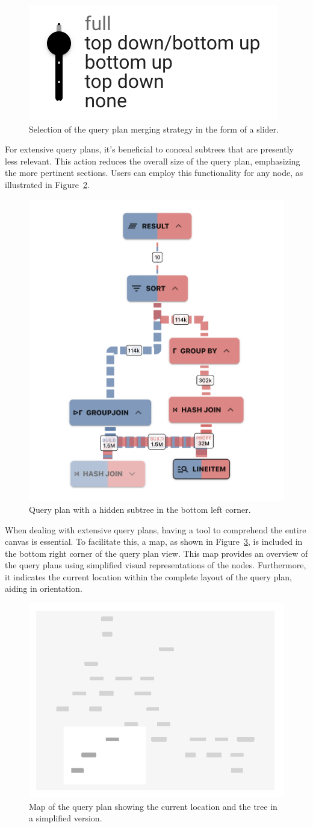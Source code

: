 \begin{figure}[h]
  \centering
  \includegraphics[width=0.25\linewidth]{figures/query-plan-slider.png}
  \caption{Selection of the query plan merging strategy in the form of a slider.}
  \label{fig:query-plan-slider}
\end{figure}

For extensive query plans, it's beneficial to conceal subtrees that are presently less relevant. This action reduces the overall size of the query plan, emphasizing the more pertinent sections. Users can employ this functionality for any node, as illustrated in Figure~\ref{fig:query-plan-hide-subtree}.

\begin{figure}[h]
  \centering
  \includegraphics[width=0.35\linewidth]{figures/query-plan-hide-subtree.png}
  \caption{Query plan with a hidden subtree in the bottom left corner.}
  \label{fig:query-plan-hide-subtree}
\end{figure}

When dealing with extensive query plans, having a tool to comprehend the entire canvas is essential. To facilitate this, a map, as shown in Figure~\ref{fig:query-plan-map}, is included in the bottom right corner of the query plan view. This map provides an overview of the query plans using simplified visual representations of the nodes. Furthermore, it indicates the current location within the complete layout of the query plan, aiding in orientation.

\begin{figure}[h]
  \centering
  \includegraphics[width=0.25\linewidth]{figures/query-plan-map.png}
  \caption{Map of the query plan showing the current location and the tree in a simplified version.}
  \label{fig:query-plan-map}
\end{figure}

